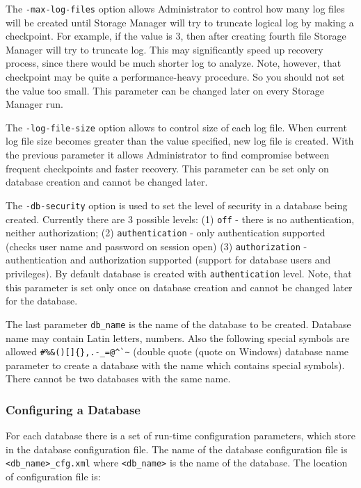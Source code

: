 \documentclass[a4paper,12pt]{article}
\begin{document}
The \verb!-max-log-files! option allows Administrator to control how many log
files will be created until Storage Manager will try to truncate logical log by
making a checkpoint. For example, if the value is 3, then after creating
fourth file Storage Manager will try to truncate log. This may significantly
speed up recovery process, since there would be much shorter log to analyze.
Note, however, that checkpoint may be quite a performance-heavy procedure. So
you should not set the value too small. This parameter can be changed later on
every Storage Manager run.

The \verb!-log-file-size! option allows to control size of each log file. When
current log file size becomes greater than the value specified, new log file is
created. With the previous parameter it allows Administrator to find compromise
between frequent checkpoints and faster recovery. This parameter can be set only
on database creation and cannot be changed later.

The \verb!-db-security! option is used to set the level of security in a
database being created. Currently there are 3 possible levels: (1) \verb!off! -
there is no authentication, neither authorization; (2) \verb!authentication! -
only authentication supported (checks user name and password on session open)
(3) \verb!authorization! - authentication and authorization supported (support
for database users and privileges). By default database is created with
\verb!authentication! level. Note, that this parameter is set only once on
database creation and cannot be changed later for the database.

The last parameter \verb!db_name! is the name of the database to be created.
Database name may contain Latin letters, numbers. Also the following special
symbols are allowed \verb!#%&()[]{},.-_=@^`~! (double quote (quote on Windows)
database name parameter to create a database with the name which contains
special symbols). There cannot be two databases with the same name.


\subsubsection{Configuring a Database}
\label{ConfigDB}

For each database there is a set of run-time configuration parameters, which
store in the database configuration file. The name of the database configuration
file is \verb!<db_name>_cfg.xml! where \verb!<db_name>! is the name of the
database. The location of configuration file is:
\end{document}
